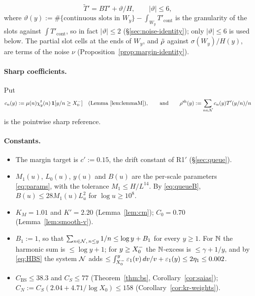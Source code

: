 \begin{itemize}
  \begin{equation}\label{eq:Ttilde}
    \tilde T'=BT'+\vartheta/H,\qquad|\vartheta|\le 6,
  \end{equation}
  where $\vartheta(y):=\#\{\text{continuous slots in }W_y\}-\int_{W_y}T'_{\mathrm{cont}}$ is the granularity of the slots
  against $\int T'_{\mathrm{cont}}$, so in fact $|\vartheta|\le2$ (\S\ref{sec:noise-identity}); only $|\vartheta|\le6$ is used below. The partial slot cells at the ends of
  $W_y$, and $\tilde\rho$ against $\sigma(W_y)/H(y)$, are terms of the noise $\nu$ (Proposition~\ref{prop:margin-identity}).
\end{itemize}

\paragraph{Sharp coefficients.} Put
\[
  c_n(y):=\mu(n)\chi^t_y(n)\,\mathbf 1[y/n\ge X_0^{-}]\quad(\text{Lemma~\ref{lem:lemmaM}}),\qquad\text{and}\qquad
  \rho^{\mathrm{sh}}(y):=\sum_{n\in\mathcal{N}}c_n(y)T'(y/n)/n
\]
is the pointwise sharp reference.

\paragraph{Constants.}
\begin{itemize}
\item The margin target is $c':=0.15$, the drift constant of R1$'$ (\S\ref{sec:queue}).
\item $M_1(u)$, $L_0(u)$, $y(u)$ and $B(u)$ are the per-scale parameters \eqref{eq:params}, with the tolerance
  $M_1\le H/L^{14}$. By \eqref{eq:queueB}, $B(u)\le 28M_1(u)L_u^2$ for $\log u\ge 10^8$.
\item $K_M=1.01$ and $K'=2.20$ (Lemma~\ref{lem:cm}); $C_0=0.70$ (Lemma~\ref{lem:smooth-v}).
\item $B_1:=1$, so that $\sum_{n\in\mathcal{N},\,n\le y}1/n\le\log y+B_1$ for every $y\ge 1$. For $\mathbb{N}$ the harmonic sum is
  $\le\log y+1$; for $y\ge X_0^{-}$ the $\mathbb{N}$-excess is $\le\gamma+1/y$, and by \eqref{eq:HBS} the system $\mathcal{N}$ adds
  $\le\int_{X_0^{-}}^y\varepsilon_1(v)\,dv/v+\varepsilon_1(y)\le 2\eta_1\le 0.002$.
\item $C_{\mathrm{BS}}\le 38.3$ and $C_S\le 77$ (Theorem~\ref{thm:bs}, Corollary~\ref{cor:saias});
  $C_N:=C_S(2.04+4.71/\log X_0)\le 158$ (Corollary~\ref{cor:kr-weights}).
\end{itemize}

